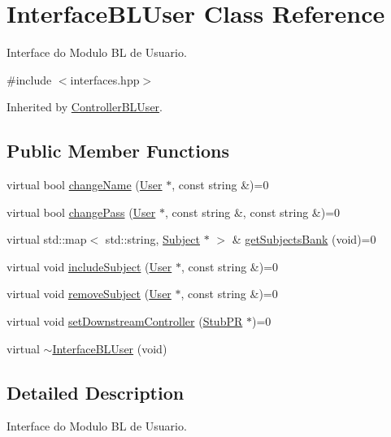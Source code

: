 \hypertarget{class_interface_b_l_user}{}\section{Interface\+B\+L\+User Class Reference}
\label{class_interface_b_l_user}


Interface do Modulo BL de Usuario.  




{\ttfamily \#include $<$interfaces.\+hpp$>$}



Inherited by \hyperlink{class_controller_b_l_user}{Controller\+B\+L\+User}.

\subsection*{Public Member Functions}
\begin{DoxyCompactItemize}
\item 
virtual bool \hyperlink{class_interface_b_l_user_a6bb394145d7e0f97902dcc2570919bb0}{change\+Name} (\hyperlink{class_user}{User} $\ast$, const string \&)=0
\item 
virtual bool \hyperlink{class_interface_b_l_user_a1d683de35fc2d6e65379add3f0a42b61}{change\+Pass} (\hyperlink{class_user}{User} $\ast$, const string \&, const string \&)=0
\item 
virtual std\+::map$<$ std\+::string, \hyperlink{class_subject}{Subject} $\ast$ $>$ \& \hyperlink{class_interface_b_l_user_a36499250fd10ab2875bbdeb6a0dd4030}{get\+Subjects\+Bank} (void)=0
\item 
virtual void \hyperlink{class_interface_b_l_user_a6b39f9aa9dff139987d2d6919a78c3d4}{include\+Subject} (\hyperlink{class_user}{User} $\ast$, const string \&)=0
\item 
virtual void \hyperlink{class_interface_b_l_user_a1444133d057934d4905bfcdf0cc4712b}{remove\+Subject} (\hyperlink{class_user}{User} $\ast$, const string \&)=0
\item 
virtual void \hyperlink{class_interface_b_l_user_ad68d0903bc24cf0fa3538be028831783}{set\+Downstream\+Controller} (\hyperlink{class_stub_p_r}{Stub\+PR} $\ast$)=0
\item 
virtual \hyperlink{class_interface_b_l_user_aa48647da4d55e385e5cead19becc1b65}{$\sim$\+Interface\+B\+L\+User} (void)
\end{DoxyCompactItemize}


\subsection{Detailed Description}
Interface do Modulo BL de Usuario. 

